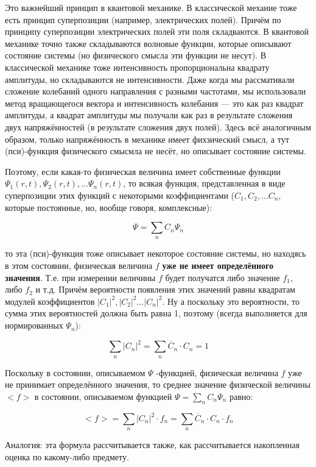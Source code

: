 \documentclass[a4paper,14pt]{article}
\begin{document}
Это важнейший принцип в квантовой механике. В классической механие тоже есть принцип суперпозиции (например, электрических полей). Причём по принципу суперпозиции электрических полей эти поля складваются. В квантовой механике точно также складываются волновые функции, которые описывают состояние системы (но физического смысла эти функции не несут). В классической механике тоже интенсивность пропорциональна квадрату амплитуды, но складываются не интенсивности. Даже когда мы рассмативали сложение колебаний одного направления с разными частотами, мы использовали метод вращающегося вектора и интенсивность колебания --- это как раз квадрат амплитуды, а квадрат амплитуды мы получали как раз в результате сложения двух напряжённостей (в результате сложения двух полей). Здесь всё аналогичным образом, только напряжённость в механике имеет фихзический смысл, а тут (пси)-функция физического смысмла не несёт, но описывает состояние системы.

Поэтому, если какая-то физическая величина имеет собственные функции $\Psi_1(r,t), \Psi_2(r,t), \dots \Psi_n(r,t)$, то всякая функция, представленная в виде суперпозиции этих функций с некоторыми коэффициентами ($C_1, C_2, \dots C_n$, которые постоянные, но, вообще говоря, комплексные):

\[\Psi=\sum\limits_n C_n \Psi_n\]

то эта (пси)-функция тоже описывает некоторое состояние системы, но находясь в этом состоянии, физическая величина $f$ \textbf{уже не имеет определённого значения}. Т.е. при измерении величины $f$ будет получатся либо значение $f_1$, либо $f_2$ и т.д. Причём вероятности появления этих значений равны квадратам модулей коэффициентов $|C_1|^2, |C_2|^2 \dots |C_n|^2$. Ну а поскольку это вероятности, то сумма этих вероятностей должна быть равна 1, поэтому (всегда выполняется для нормированных $\Psi_n$):

\[\sum\limits_n |C_n|^2 = \sum\limits_n \overline C_n \cdot C_n = 1\]

Поскольку в состоянии, описываемом $\Psi$ -функцией, физическая величина $f$ уже не принимает определённого значения, то среднее значение физической величины $<f>$ в состоянии, описываемом функцией $\Psi = \sum\limits_n C_n \Psi_n$ равно:

\[<f> = \sum\limits_n |C_n|^2 \cdot f_n = \sum\limits_n \overline C_n \cdot C_n \cdot  f_n\] 

Аналогия: эта формула рассчитывается также, как рассчитывается накопленная оценка по какому-либо предмету.
\end{document}
